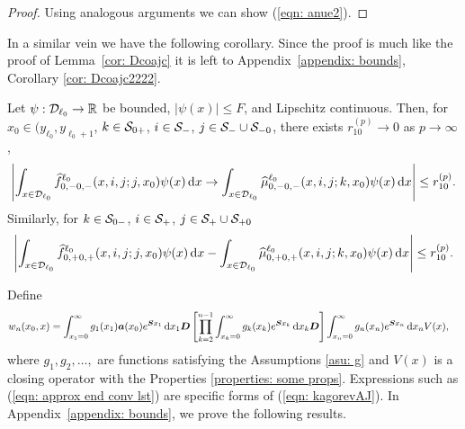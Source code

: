 \begin{proof}
                Using analogous arguments we can show  (\ref{eqn: anue2}).
\end{proof}
In a similar vein we have the following corollary. Since the proof is much like the proof of Lemma~\ref{cor: Dcoajc} it is left to Appendix~\ref{appendix: bounds}, Corollary \ref{cor: Dcoajc2222}. 
\begin{cor}\label{cor: Dcoajc}
	Let \(\psi:\mathcal{D}_{\ell_0}\to \mathbb R\) be bounded, \(|\psi(x)|\leq F\), and Lipschitz continuous. Then, for \(x_0\in(y_{\ell_0},y_{\ell_0+1}\), \(k\in\mathcal{S}_{0+}\), \(i\in\mathcal{S}_-\), \(j\in\mathcal{S}_-\cup\mathcal{S}_{-0}\), there exists \(r_{10}^{(p)}\to 0\) as \(p \to \infty\), 
	\begin{align}
		\left|\int_{x\in\mathcal{D}_{\ell_0}} \widehat f_{0,-0,-}^{\ell_0}(x,i,j;j,x_0)\psi(x)\, \mathrm{d} x  \to \int_{x\in\mathcal{D}_{\ell_0}} \widehat \mu_{0,-0,-}^{\ell_0}(x,i,j;k,x_0)\psi(x)\, \mathrm{d} x\right|\leq r_{10}^{(p)}.\label{eqn:xs}
	\end{align}
	Similarly, for \(k\in\mathcal{S}_{0-}\), \(i\in\mathcal{S}_+\), \(j\in\mathcal{S}_+\cup\mathcal{S}_{+0}\)
	\begin{align}
		\left|\int_{x\in\mathcal{D}_{\ell_0}} \widehat f_{0,+0,+}^{\ell_0}(x,i,j;j,x_0)\psi(x)\, \mathrm{d} x  - \int_{x\in\mathcal{D}_{\ell_0}} \widehat \mu_{0,+0,+}^{\ell_0}(x,i,j;k,x_0)\psi(x)\, \mathrm{d} x\right|\leq r_{10}^{(p)}.\label{eqn:!124mcds}
	\end{align}
\end{cor}

Define 
\begin{align}
		w_n(x_0,x) &= \int_{x_1=0}^\infty g_1(x_1) \boldsymbol a (x_0) e^{\boldsymbol{S}x_1}\, \mathrm{d} x_1\boldsymbol D 
            	\left[\prod_{k=2}^{n-1}\int_{x_k=0}^\infty g_k(x_k) e^{\boldsymbol{S}x_k} \, \mathrm{d} x_k \boldsymbol D\right] \int_{x_n=0}^\infty g_{n}(x_n) e^{\boldsymbol{S}x_n} \, \mathrm{d} x_n V(x), \label{eqn: kagorevAJ}
\end{align}
where \(g_1,g_2,\dots,\) are functions satisfying the Assumptions \ref{asu: g} and \(V(x)\) is a closing operator with the Properties \ref{properties: some props}. Expressions such as (\ref{eqn: approx end conv lst}) are specific forms of (\ref{eqn: kagorevAJ}). In Appendix~\ref{appendix: bounds}, we prove the following results. %

